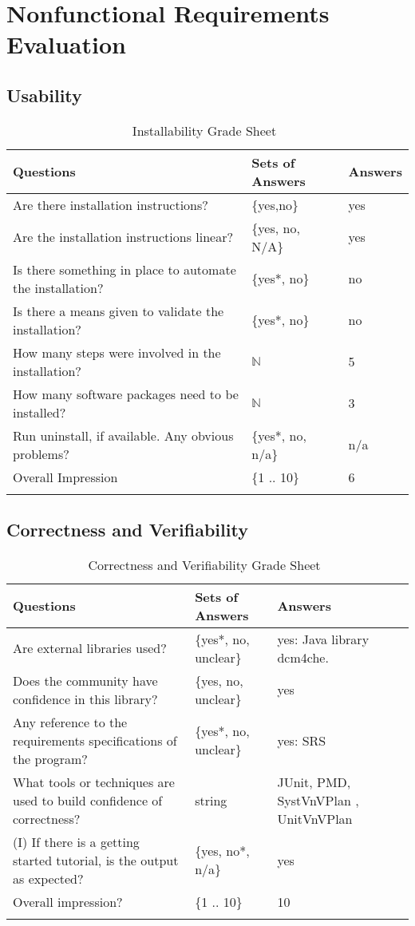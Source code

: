 \documentclass[12pt, titlepage]{article}
\begin{document}
\section{Nonfunctional Requirements Evaluation}

\subsection{Usability}

\begin{longtable}{p{10cm} l l}
\toprule
Questions & Sets of Answers & Answers\\ \midrule
Are there installation instructions? & \{yes,no\} & yes\\
Are the installation instructions linear? & \{yes, no, N/A\} & yes\\
Is there something in place to automate the installation? & \{yes*, no\} & no\\
Is there a means given to validate the installation? & \{yes*, no\} & no\\
How many steps were involved in the installation? & $\mathbb{N}$ & 5\\
How many software packages need to be installed? & $\mathbb{N}$ & 3\\
Run uninstall, if available. Any obvious problems? & \{yes*, no, n/a\} & n/a\\
Overall Impression & \{1 .. 10\} & 6\\
\bottomrule
\caption{Installability Grade Sheet~\cite{SmithEtAl2018}}
\label{Tb_installability}
\end{longtable}

\subsection{Correctness and Verifiability}

\begin{longtable}{p{8cm} l p{5cm}}
\toprule
Questions & Sets of Answers & Answers\\ \midrule
Are external libraries used? & \{yes*, no, unclear\} & yes: Java library
dcm4che.\\
Does the community have confidence in this library? & \{yes, no, unclear\} &
yes\\
Any reference to the requirements specifications of the program? & \{yes*, no,
unclear\} & yes: SRS \cite{Dong2019SRS}\\
What tools or techniques are used to build confidence of correctness? & string
&JUnit, PMD, SystVnVPlan \cite{Dong2019SystVnV}, UnitVnVPlan
\cite{Dong2019UnitVnV}
\\
(I) If there is a getting started tutorial, is the output as expected? & \{yes,
no*, n/a\} & yes\\
Overall impression? & \{1 .. 10\} & 10\\
\bottomrule
\caption{Correctness and Verifiability Grade Sheet~\cite{SmithEtAl2018}}
\label{Tb_correctnessVerifiability}
\end{longtable}
\end{document}
